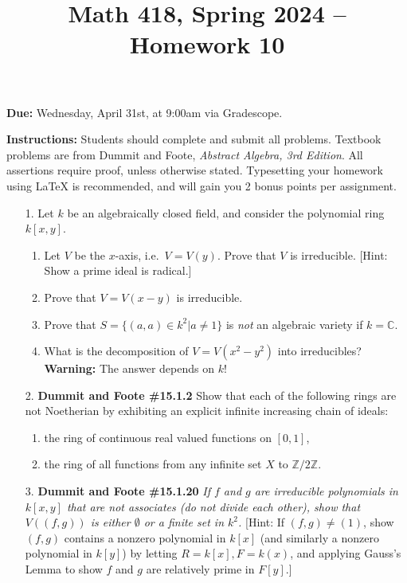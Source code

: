\documentclass[12pt]{article}
\title{Math 418, Spring 2024 -- Homework 10}
\date{}
\newcommand{\Z}{\mathbb{Z}}
\newcommand{\C}{\mathbb{C}}
\begin{document}
 \maketitle
\vspace{-80pt}

\textbf{Due:} Wednesday, April 31st, at 9:00am via Gradescope.

\textbf{Instructions:} Students should complete and submit all problems. Textbook problems are from Dummit and Foote, \emph{Abstract Algebra, 3rd Edition}. All assertions require proof, unless otherwise stated. Typesetting your homework using LaTeX is recommended, and will gain you 2 bonus points per assignment.

\begin{enumerate}

\item[1.] Let $k$ be an algebraically closed field, and consider the polynomial ring $k[x,y]$.  
  \begin{enumerate}
  \item Let $V$ be the $x$-axis, i.e.~$V = V(y)$. Prove that $V$ is irreducible. [Hint: Show a prime ideal is radical.]
  \item Prove that $V = V(x - y)$ is irreducible. 
  \item Prove that $S = \{(a,a) \in k^2 |a \neq 1\}$ is \emph{not} an algebraic variety if $k = \C$.
  \item What is the decomposition of $V = V(x^2 - y^2)$ into irreducibles?  \textbf{Warning:} The answer depends on $k$!
  \end{enumerate}

\item[2.] \textbf{Dummit and Foote \#15.1.2} Show that each of the following rings are not Noetherian by exhibiting an explicit infinite increasing chain of ideals:

\begin{enumerate}
\item the ring of continuous real valued functions on $[0, 1]$,
\item the ring of all functions from any infinite set $X$ to $\Z/2\Z$.
\end{enumerate}

\item[3.] \textbf{Dummit and Foote \#15.1.20} \textit{If $f$ and $g$ are irreducible polynomials in $k[x, y]$ that are not associates (do not divide each other), show that $V((f, g))$ is either $\emptyset$ or a finite set in $k^2$.} [Hint: If $(f, g) \ne (1)$, show $(f, g)$ contains a nonzero polynomial in $k[x]$ (and similarly a nonzero polynomial in $k[y]$) by letting $R = k[x], F = k(x)$, and applying Gauss's Lemma to show $f$ and $g$ are relatively prime in $F[y]$.]


\end{enumerate}
\end{document}
